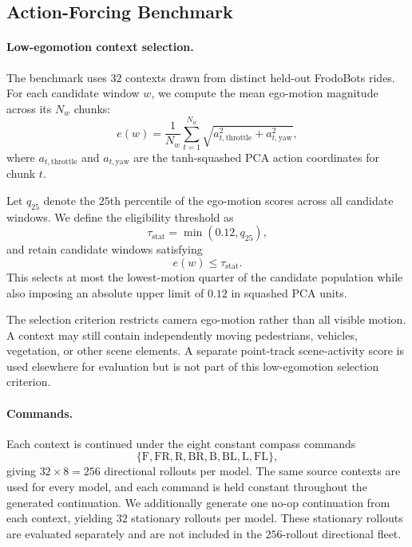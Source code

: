 \documentclass[letterpaper]{article} %
\begin{document}
\subsection{Action-Forcing Benchmark}
\label{app:action_forcing_details}

\paragraph{Low-egomotion context selection.}
The benchmark uses $32$ contexts drawn from distinct held-out FrodoBots rides.
For each candidate window $w$, we compute the mean ego-motion magnitude across
its $N_w$ chunks:
\[
e(w)
=
\frac{1}{N_w}
\sum_{t=1}^{N_w}
\sqrt{
a_{t,\mathrm{throttle}}^2
+
a_{t,\mathrm{yaw}}^2
},
\]
where $a_{t,\mathrm{throttle}}$ and $a_{t,\mathrm{yaw}}$ are the
tanh-squashed PCA action coordinates for chunk $t$.

Let $q_{25}$ denote the $25$th percentile of the ego-motion scores across all
candidate windows. We define the eligibility threshold as
\[
\tau_{\mathrm{stat}}
=
\min(0.12,q_{25}),
\]
and retain candidate windows satisfying
\[
e(w)\leq\tau_{\mathrm{stat}}.
\]
This selects at most the lowest-motion quarter of the candidate population
while also imposing an absolute upper limit of $0.12$ in squashed PCA units.

The selection criterion restricts camera ego-motion rather than all visible
motion. A context may still contain independently moving pedestrians,
vehicles, vegetation, or other scene elements. A separate point-track
scene-activity score is used elsewhere for evaluation but is not part of
this low-egomotion selection criterion.

\paragraph{Commands.}
Each context is continued under the eight constant compass commands
\[
\{
\mathrm{F},\mathrm{FR},\mathrm{R},\mathrm{BR},
\mathrm{B},\mathrm{BL},\mathrm{L},\mathrm{FL}
\},
\]
giving $32\times8=256$ directional rollouts per model. The same source
contexts are used for every model, and each command is held constant throughout
the generated continuation. We additionally generate one no-op continuation
from each context, yielding $32$ stationary rollouts per model. These stationary
rollouts are evaluated separately and are not included in the $256$-rollout
directional fleet.
\end{document}
